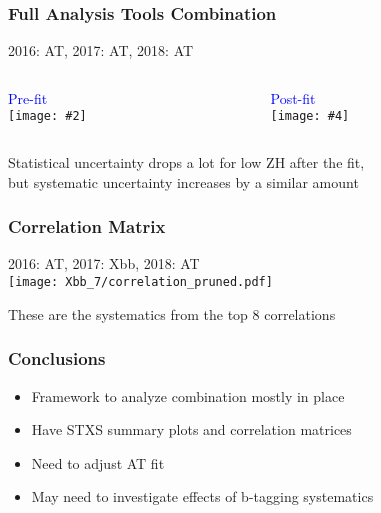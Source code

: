 \documentclass{beamer}
\newcommand{\beginbackup}{
  \newcounter{framenumbervorappendix}
  \setcounter{framenumbervorappendix}{\value{framenumber}}
}
\newcommand{\backupend}{
  \addtocounter{framenumbervorappendix}{-\value{framenumber}}
  \addtocounter{framenumber}{\value{framenumbervorappendix}}
}
\newcommand{\twofigs}[4]{
  \begin{columns}
    \begin{column}{0.5\linewidth}
      \centering
      \textcolor{blue}{#1} \\
      \texttt{[image: \#2]}
    \end{column}
    \begin{column}{0.5\linewidth}
      \centering
      \textcolor{blue}{#3} \\
      \texttt{[image: \#4]}
    \end{column}
  \end{columns}
}
\begin{document}
\begin{frame}

  \frametitle{Full Analysis Tools Combination}

  \begin{center}
  2016: AT, 2017: AT, 2018: AT
  \end{center}

  \twofigs{Pre-fit}
          {AT/prefit_summary_stxs.pdf}
          {Post-fit}
          {AT/summary_stxs.pdf}

  \vfill

  Statistical uncertainty drops a lot for low ZH after the fit, \\
  but systematic uncertainty increases by a similar amount

\end{frame}

\begin{frame}

  \frametitle{Correlation Matrix}

  \begin{center}
  2016: AT, 2017: Xbb, 2018: AT \\
  \texttt{[image: Xbb\_7/correlation\_pruned.pdf]}
  \end{center}

  These are the systematics from the top 8 correlations

\end{frame}

\begin{frame}

  \frametitle{Conclusions}

  \begin{itemize}
  \item Framework to analyze combination mostly in place
  \item Have STXS summary plots and correlation matrices
  \item Need to adjust AT fit
  \item May need to investigate effects of b-tagging systematics
  \end{itemize}

\end{frame}

\begin{comment}
\beginbackup

\begin{frame}
  \centering
    {\Huge \bf\sffamily Backup Slides}
\end{frame}



\backupend
\end{comment}
\end{document}
